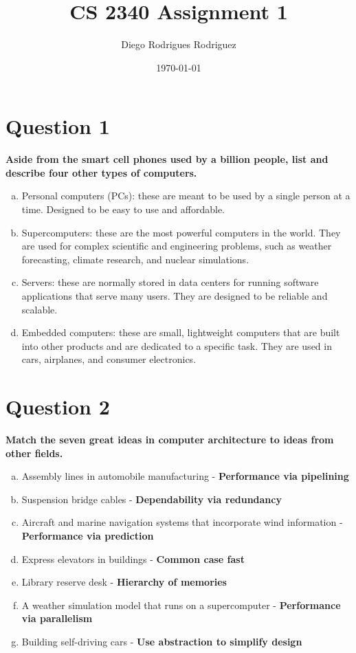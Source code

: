 \documentclass[12pt]{article}
\begin{document}
\title{CS 2340 Assignment 1}
\author{Diego Rodrigues Rodriguez}
\date{\today}
\maketitle

\section*{Question 1}
\textbf{Aside from the smart cell phones used by a billion people, list and describe four other types of computers.}
\begin{enumerate}[a)]
    \item Personal computers (PCs): these are meant to be used by a single person at a time. Designed to be easy to use and affordable.
    \item Supercomputers: these are the most powerful computers in the world. They are used for complex scientific and engineering problems, such as weather forecasting, climate research, and nuclear simulations.
    \item Servers: these are normally stored in data centers for running software applications that serve many users. They are designed to be reliable and scalable.
    \item Embedded computers: these are small, lightweight computers that are built into other products and are dedicated to a specific task. They are used in cars, airplanes, and consumer electronics.
\end{enumerate}

\section*{Question 2}
\textbf{Match the seven great ideas in computer architecture to ideas from other fields.}

\begin{enumerate}[a)]
    \item Assembly lines in automobile manufacturing - \textbf{Performance via pipelining}
    \item Suspension bridge cables - \textbf{Dependability via redundancy}
    \item Aircraft and marine navigation systems that incorporate wind information - \textbf{Performance via prediction}
    \item Express elevators in buildings - \textbf{Common case fast}
    \item Library reserve desk - \textbf{Hierarchy of memories}
    \item A weather simulation model that runs on a supercomputer - \textbf{Performance via parallelism}
    \item Building self-driving cars - \textbf{Use abstraction to simplify design}
\end{enumerate}
\end{document}
